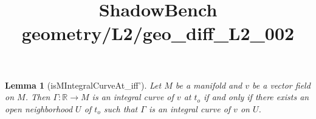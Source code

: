 \documentclass{article}
\title{ShadowBench geometry/L2/geo\_diff\_L2\_002}
\newtheorem{lemma}{Lemma}
\begin{document}
\maketitle

\begin{lemma}[isMIntegralCurveAt_iff']
Let $M$ be a manifold and $v$ be a vector field on $M$. Then $\Gamma : ℝ → M$ is an integral curve of $v$ at $t_o$ 
if and only if there exists an open neighborhood $U$ of $t_o$ such that $\Gamma$ is an integral curve of $v$ on $U$.
\end{lemma}
\end{document}
